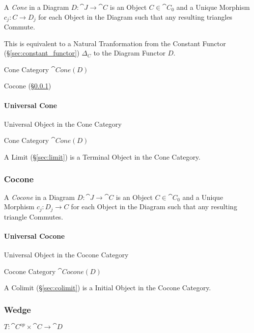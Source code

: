 A \emph{Cone} in a Diagram $D : \cat{J} \rightarrow \cat{C}$ is
an Object $C \in \cat{C}_0$ and a Unique Morphism $c_j : C
\rightarrow D_j$ for each Object in the Diagram such that any
resulting triangles Commute.

This is equivalent to a Natural Tranformation from the Constant
Functor (\S\ref{sec:constant_functor}) $\Delta_C$ to the Diagram
Functor $D$.

Cone Category $\cat{Cone}(D)$

Cocone (\S\ref{sec:cocone})



\paragraph{Universal Cone}\label{sec:universal_cone}\hfill

Universal Object in the Cone Category

Cone Category $\cat{Cone}(D)$

A Limit (\S\ref{sec:limit}) is a Terminal Object in the Cone
Category.



\subsubsection{Cocone}\label{sec:cocone}

A \emph{Cocone} in a Diagram $D : \cat{J} \rightarrow \cat{C}$
is an Object $C \in \cat{C}_0$ and a Unique Morphism $c_j : D_j
\rightarrow C$ for each Object in the Diagram such that any resulting
triangle Commutes.




\paragraph{Universal Cocone}\label{sec:universal_cocone}\hfill

Universal Object in the Cocone Category

Cocone Category $\cat{Cocone}(D)$

A Colimit (\S\ref{sec:colimit}) is a Initial Object in the Cocone
Category.



\subsubsection{Wedge}\label{sec:wedge}

$T : \cat{C}^{op} \times \cat{C} \rightarrow \cat{D}$

